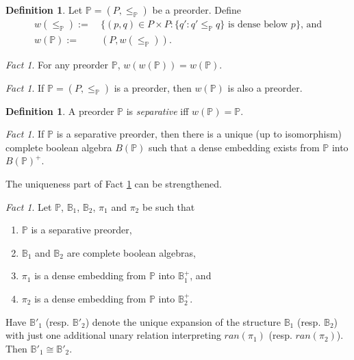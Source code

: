 \documentclass[12pt, twoside]{memoir}
\numberwithin{equation}{section}
\theoremstyle{definition}
\newtheorem{defi}[thm]{Definition}
\theoremstyle{remark}
\newtheorem{fact}[thm]{Fact}
\theoremstyle{definition}
\theoremstyle{definition}
\theoremstyle{definition}
\theoremstyle{remark}
\begin{document}
\begin{defi}
Let $\mathbb{P} = (P, \leq_{\mathbb{P}})$ be a preorder. Define \begin{align*}
    w(\leq_{\mathbb{P}}) := \ & \{(p, q) \in P \times P : \{q' : q' \leq_{\mathbb{P}} q\} \text{ is dense below } p\} \text{, and} \\
    w(\mathbb{P}) := \ & (P, w(\leq_{\mathbb{P}})) \text{.}
\end{align*}
\end{defi}

\begin{fact}\label{wfixedp}
For any preorder $\mathbb{P}$, $w(w(\mathbb{P})) = w(\mathbb{P})$.
\end{fact}

\begin{fact}\label{seppre}
If $\mathbb{P} = (P, \leq_{\mathbb{P}})$ is a preorder, then $w(\mathbb{P})$ is also a preorder.
\end{fact}

\begin{defi}
A preorder $\mathbb{P}$ is \emph{separative} iff $w(\mathbb{P}) = \mathbb{P}$.
\end{defi}

\begin{fact}\label{bcompletion}
If $\mathbb{P}$ is a separative preorder, then there is a unique (up to isomorphism) complete boolean algebra $B(\mathbb{P})$ such that a dense embedding exists from $\mathbb{P}$ into $B(\mathbb{P})^+$.
\end{fact}

The uniqueness part of Fact \ref{bcompletion} can be strengthened.

\begin{fact}\label{bcompletion2}
Let $\mathbb{P}$, $\mathbb{B}_1$, $\mathbb{B}_2$, $\pi_1$ and $\pi_2$ be such that
\begin{enumerate}[label=(\arabic*)]
    \item $\mathbb{P}$ is a separative preorder,
    \item $\mathbb{B}_1$ and $\mathbb{B}_2$ are complete boolean algebras,
    \item $\pi_1$ is a dense embedding from $\mathbb{P}$ into $\mathbb{B}_1^+$, and
    \item $\pi_2$ is a dense embedding from $\mathbb{P}$ into $\mathbb{B}_2^+$.
\end{enumerate}
Have $\mathbb{B}'_1$ (resp. $\mathbb{B}'_2$) denote the unique expansion of the structure $\mathbb{B}_1$ (resp. $\mathbb{B}_2$) with just one additional unary relation interpreting $ran(\pi_1)$ (resp. $ran(\pi_2)$). Then $\mathbb{B}'_1 \cong \mathbb{B}'_2$.
\end{fact}
\end{document}
